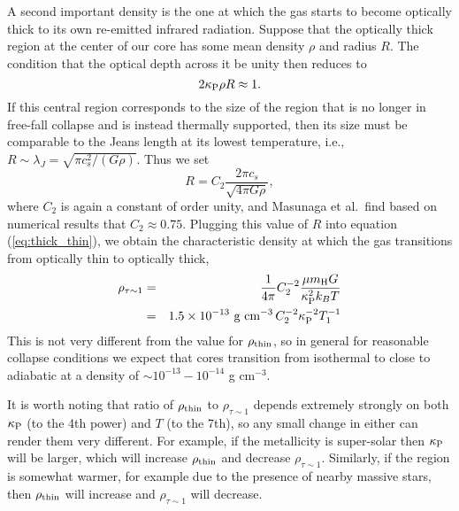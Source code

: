 A second important density is the one at which the gas starts to become optically thick to its own re-emitted infrared radiation. Suppose that the optically thick region at the center of our core has some mean density $\rho$ and radius $R$. The condition that the optical depth across it be unity then reduces to
\begin{equation}
\label{eq:thick_thin}
2 \kappa_{\rm P} \rho R \approx 1.
\end{equation}
If this central region corresponds to the size of the region that is no longer in free-fall collapse and is instead thermally supported, then its size must be comparable to the Jeans length at its lowest temperature, i.e., $R\sim \lambda_J = \sqrt{\pi c_s^2/(G\rho)}$. Thus we set
\begin{equation}
R = C_2 \frac{2\pi c_s}{\sqrt{4\pi G \rho}},
\end{equation}
where $C_2$ is again a constant of order unity, and Masunaga et al.\ find based on numerical results that $C_2\approx 0.75$. Plugging this value of $R$ into equation (\ref{eq:thick_thin}), we obtain the characteristic density at which the gas transitions from optically thin to optically thick,
\begin{eqnarray}
\rho_{\tau\sim 1} & = & \frac{1}{4\pi} C_2^{-2} \frac{\mu m_{\rm H} G}{\kappa_{\rm P}^2 k_B T} \\
& = & 
1.5\times 10^{-13}\mbox{ g cm}^{-3}\,  C_2^{-2} \kappa_{\rm P}^{-2} T_1^{-1}
\end{eqnarray}
This is not very different from the value for $\rho_{\rm thin}$, so in general for reasonable collapse conditions we expect that cores transition from isothermal to close to adiabatic at a density of $\sim 10^{-13}-10^{-14}$ g cm$^{-3}$.

It is worth noting that ratio of $\rho_{\rm thin}$ to $\rho_{\tau\sim 1}$ depends extremely strongly on both $\kappa_{\rm P}$ (to the 4th power) and $T$ (to the 7th), so any small change in either can render them very different. For example, if the metallicity is super-solar then $\kappa_{\rm P}$ will be larger, which will increase $\rho_{\rm thin}$ and decrease $\rho_{\tau\sim 1}$.
Similarly, if the region is somewhat warmer, for example due to the presence of nearby massive stars, then $\rho_{\rm thin}$ will increase and $\rho_{\tau\sim 1}$ will decrease.

